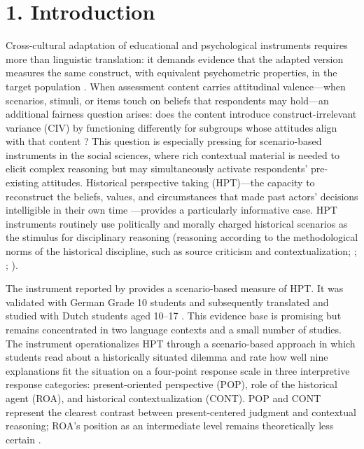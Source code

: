 \documentclass[PCJ,Unicode,screen,mode=plain]{cedram}
\title{}
\author{}
\begin{document}
\maketitle
\onehalfspacing

\section*{1. Introduction}\label{introduction}

Cross-cultural adaptation of educational and psychological instruments
requires more than linguistic translation: it demands evidence that
the adapted version measures the same construct, with equivalent
psychometric properties, in the target population \citep{Hambleton2005,ITC2017}. When assessment content carries
attitudinal valence---when scenarios, stimuli, or items touch on
beliefs that respondents may hold---an additional fairness question
arises: does the content introduce construct-irrelevant variance (CIV)
by functioning differently for subgroups whose attitudes align with
that content \citep{Messick1995Validity}? This question is especially pressing for
scenario-based instruments in the social sciences, where rich
contextual material is needed to elicit complex reasoning but may
simultaneously activate respondents' pre-existing attitudes.
Historical perspective taking (HPT)---the capacity to reconstruct the
beliefs, values, and circumstances that made past actors' decisions
intelligible in their own time \citep{Hartmann_Hasselhorn2008Historical,Lee_Ashby2001Empathy}---provides a particularly informative case. HPT
instruments routinely use politically and morally charged historical
scenarios as the stimulus for disciplinary reasoning (reasoning
according to the methodological norms of the historical discipline,
such as source criticism and contextualization; \citealp{VanDrie_VanBoxtel2008Historical}; \citealp{Seixas_Morton2013TheBig}; \citealp{Wineburg2001Historical}).

The instrument reported by \citet{Hartmann_Hasselhorn2008Historical} provides a
scenario-based measure of HPT. It was validated with German Grade 10
students \citep{Hartmann_Hasselhorn2008Historical} and subsequently
translated and studied with Dutch students aged 10--17
\citep{Huijgen_et_al2014Testing,Huijgen_et_al2017Toward}. This evidence
base is promising but remains concentrated in two language contexts
and a small number of studies. The instrument operationalizes HPT through a scenario-based
approach in which students read about a historically situated dilemma
and rate how well nine explanations fit the situation on a four-point
response scale in three interpretive response categories: present-oriented perspective (POP), role of the
historical agent (ROA), and historical contextualization (CONT). POP
and CONT represent the clearest contrast between present-centered
judgment and contextual reasoning; ROA's position as an intermediate
level remains theoretically less certain
\citep{Hartmann_Hasselhorn2008Historical,Lee_Ashby2001Empathy}.
\end{document}
